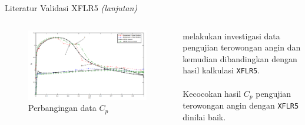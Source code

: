 \begin{frame}{Literatur Validasi XFLR5 \textit{(lanjutan)}}
  \begin{columns}[t]
    \begin{column}{.5\linewidth}
      \begin{figure}[h]
        \centering
        \includegraphics[width=0.8\linewidth]{statics/compar_airfoil2}
        \caption{Perbangingan data $C_p$}
        \label{fig:comparairfoil2}
      \end{figure}
    \end{column}

    \begin{column}{.5\linewidth}
      \begin{block}{}
        \cite{wahidi2009experimental} melakukan investigasi data pengujian terowongan angin dan kemudian dibandingkan dengan hasil kalkulasi \texttt{XFLR5}.\\~\\

        Kecocokan hasil $C_p$ pengujian terowongan angin dengan \texttt{XFLR5} dinilai baik.
      \end{block}
    \end{column}
  \end{columns}
\end{frame}

